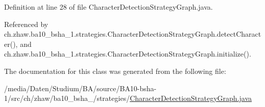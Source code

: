 Definition at line 28 of file CharacterDetectionStrategyGraph.java.

Referenced by ch.zhaw.ba10\_\-bsha\_\-1.strategies.CharacterDetectionStrategyGraph.detectCharacter(), and ch.zhaw.ba10\_\-bsha\_\-1.strategies.CharacterDetectionStrategyGraph.initialize().

The documentation for this class was generated from the following file:\begin{DoxyCompactItemize}
\item 
/media/Daten/Studium/BA/source/BA10-\/bsha-\/1/src/ch/zhaw/ba10\_\-bsha\_/strategies/\hyperlink{CharacterDetectionStrategyGraph_8java}{CharacterDetectionStrategyGraph.java}\end{DoxyCompactItemize}
